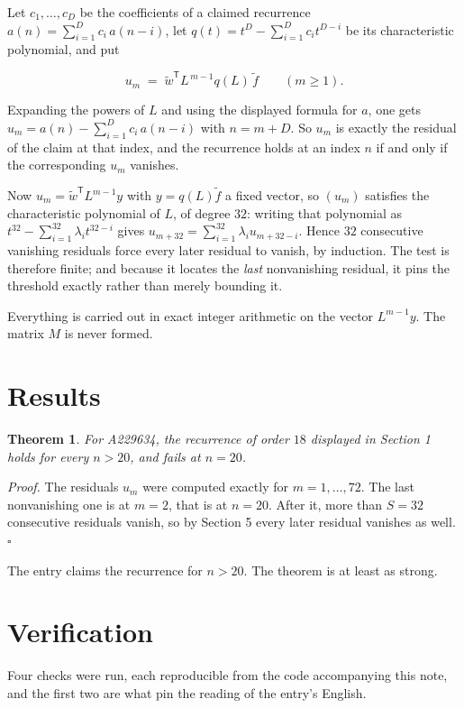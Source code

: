 \documentclass[11pt]{article}
\newtheorem{theorem}{Theorem}
\theoremstyle{definition}
\begin{document}
Let $c_1,\dots,c_D$ be the coefficients of a claimed recurrence $a(n) = \sum_{i=1}^{D} c_i\,a(n-i)$, let $q(t) = t^{D} - \sum_{i=1}^{D} c_i t^{D-i}$ be its characteristic polynomial, and put

\[u_m \;=\; \tilde w^{\mathsf T} L^{\,m-1} q(L)\,\tilde f \qquad (m \ge 1).\]

Expanding the powers of $L$ and using the displayed formula for $a$, one gets $u_m = a(n) - \sum_{i=1}^{D} c_i\,a(n-i)$ with $n = m + D$. So $u_m$ is exactly the residual of the claim at that index, and the recurrence holds at an index $n$ if and only if the corresponding $u_m$ vanishes.

Now $u_m = \tilde w^{\mathsf T} L^{m-1} y$ with $y = q(L)\tilde f$ a fixed vector, so $(u_m)$ satisfies the characteristic polynomial of $L$, of degree $32$: writing that polynomial as $t^{32} - \sum_{i=1}^{32} \lambda_i t^{32-i}$ gives $u_{m+32} = \sum_{i=1}^{32} \lambda_i u_{m+32-i}$. Hence $32$ consecutive vanishing residuals force every later residual to vanish, by induction. The test is therefore finite; and because it locates the {\itshape last} nonvanishing residual, it pins the threshold exactly rather than merely bounding it.

Everything is carried out in exact integer arithmetic on the vector $L^{m-1}y$. The matrix $M$ is never formed.

\section{Results}

\begin{theorem} For A229634, the recurrence of order $18$ displayed in Section 1 holds for every $n > 20$, and fails at $n = 20$.\end{theorem}

{\itshape Proof.} The residuals $u_m$ were computed exactly for $m = 1,\dots,72$. The last nonvanishing one is at $m = 2$, that is at $n = 20$. After it, more than $S = 32$ consecutive residuals vanish, so by Section 5 every later residual vanishes as well. $\square$

The entry claims the recurrence for $n > 20$. The theorem is at least as strong.

\section{Verification}

Four checks were run, each reproducible from the code accompanying this note, and the first two are what pin the reading of the entry's English.
\end{document}

